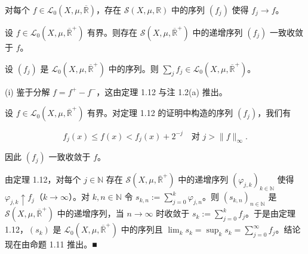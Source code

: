 \begin{corollary}

\begin{subitems}
\item

对每个 $ f \in \mathcal{L}_0(X,\mu,\overline{\mathbb{R}}) $，存在 $ \mathcal{S}(X,\mu,\mathbb{R}) $ 中的序列 $ (f_j) $ 使得 $ f_j \to f $。

\item

设 $ f \in \mathcal{L}_0(X,\mu,\overline{\mathbb{R}}^{+}) $ 有界。则存在 $ \mathcal{S}(X,\mu,\overline{\mathbb{R}}^{+}) $ 中的递增序列 $ (f_j) $ 一致收敛于 $ f $。

\item

设 $ (f_j) $ 是 $ \mathcal{L}_0(X,\mu,\overline{\mathbb{R}}^{+}) $ 中的序列。则 $ \sum_j f_j \in \mathcal{L}_0(X,\mu,\overline{\mathbb{R}}^{+}) $。

\proofhead
(i) 鉴于分解 $ f = f^{+} - f^{-} $，这由定理 1.12 与注 1.2(a) 推出。
\end{subitems}

\begin{subitems}
\item[（ii）]

设 $ f \in \mathcal{L}_0(X,\mu,\overline{\mathbb{R}}^{+}) $ 有界。对定理 1.12 的证明中构造的序列 $ (f_j) $，我们有

\[
f_j(x) \le f(x) < f_j(x) + 2^{-j} \quad \text{对 } j > \|f\|_\infty .
\]

因此 $ (f_j) $ 一致收敛于 $ f $。

\item[（iii）]

由定理 1.12，对每个 $ j \in \mathbb{N} $ 存在 $ \mathcal{S}(X,\mu,\overline{\mathbb{R}}^{+}) $ 中的递增序列 $ (\varphi_{j,k})_{k \in \mathbb{N}} $ 使得 $ \varphi_{j,k} \uparrow f_j $（$ k \to \infty $）。对 $ k, n \in \mathbb{N} $ 令 $ s_{k,n} := \sum_{j=0}^{k} \varphi_{j,n} $。则 $ (s_{k,n})_{n \in \mathbb{N}} $ 是 $ \mathcal{S}(X,\mu,\overline{\mathbb{R}}^{+}) $ 中的递增序列，当 $ n \to \infty $ 时收敛于 $ s_k := \sum_{j=0}^{k} f_j $。于是由定理 1.12，$ (s_k) $ 是 $ \mathcal{L}_0(X,\mu,\overline{\mathbb{R}}^{+}) $ 中的序列且 $ \lim_k s_k = \sup_k s_k = \sum_{j=0}^{\infty} f_j $。结论现在由命题 1.11 推出。\nobreak\hspace{0.35em}■

\end{subitems}

\end{corollary}

